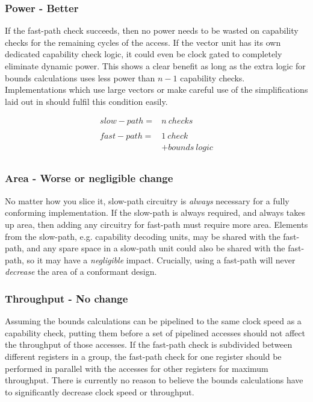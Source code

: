 \subsubsection*{Power - Better}
If the fast-path check succeeds, then no power needs to be wasted on capability checks for the remaining cycles of the access.
If the vector unit has its own dedicated capability check logic, it could even be clock gated to completely eliminate dynamic power.
This shows a clear benefit as long as the extra logic for bounds calculations uses less power than $n - 1$ capability checks.
Implementations which use large vectors or make careful use of the simplifications laid out in  should fulfil this condition easily.

\begin{equation}
\begin{array}{lr}
    \mathit{slow-path} =& n\ \mathit{checks} \\
&\\
    \mathit{fast-path} =& 1\ \mathit{check} \\
     &+ \mathit{bounds}\ \mathit{logic} \\

\end{array}
\end{equation}

\subsubsection*{Area - Worse or negligible change}
No matter how you slice it, slow-path circuitry is \emph{always} necessary for a fully conforming implementation.
If the slow-path is always required, and always takes up area, then adding any circuitry for fast-path must require more area.
Elements from the slow-path, e.g. capability decoding units, may be shared with the fast-path, and any spare space in a slow-path unit could also be shared with the fast-path, so it may have a \emph{negligible} impact.
Crucially, using a fast-path will never \emph{decrease} the area of a conformant design.

\subsubsection*{Throughput - No change}
Assuming the bounds calculations can be pipelined to the same clock speed as a capability check, putting them before a set of pipelined accesses should not affect the throughput of those accesses.
If the fast-path check is subdivided between different registers in a group, the fast-path check for one register should be performed in parallel with the accesses for other registers for maximum throughput.
There is currently no reason to believe the bounds calculations have to significantly decrease clock speed or throughput.

